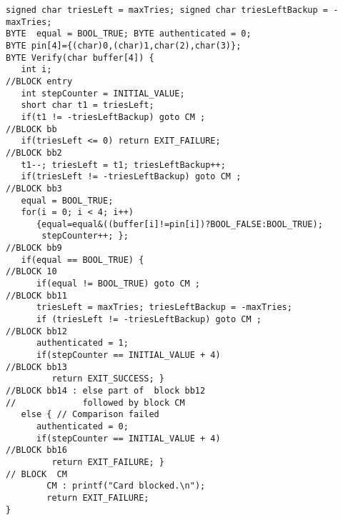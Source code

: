 \begin{scriptsize}
\begin{lstlisting}[]
signed char triesLeft = maxTries; signed char triesLeftBackup = -maxTries;
BYTE  equal = BOOL_TRUE; BYTE authenticated = 0;
BYTE pin[4]={(char)0,(char)1,char(2),char(3)};
BYTE Verify(char buffer[4]) {
   int i;
//BLOCK entry
   int stepCounter = INITIAL_VALUE;
   short char t1 = triesLeft;
   if(t1 != -triesLeftBackup) goto CM ;
//BLOCK bb
   if(triesLeft <= 0) return EXIT_FAILURE;
//BLOCK bb2
   t1--; triesLeft = t1; triesLeftBackup++;
   if(triesLeft != -triesLeftBackup) goto CM ;
//BLOCK bb3
   equal = BOOL_TRUE;
   for(i = 0; i < 4; i++)
      {equal=equal&((buffer[i]!=pin[i])?BOOL_FALSE:BOOL_TRUE);
       stepCounter++; };
//BLOCK bb9
   if(equal == BOOL_TRUE) {
//BLOCK 10
      if(equal != BOOL_TRUE) goto CM ;
//BLOCK bb11
      triesLeft = maxTries; triesLeftBackup = -maxTries;
      if (triesLeft != -triesLeftBackup) goto CM ;
//BLOCK bb12
      authenticated = 1;
      if(stepCounter == INITIAL_VALUE + 4) 
//BLOCK bb13 
         return EXIT_SUCCESS; }
//BLOCK bb14 : else part of  block bb12 
//             followed by block CM
   else { // Comparison failed
      authenticated = 0;
      if(stepCounter == INITIAL_VALUE + 4) 
//BLOCK bb16
         return EXIT_FAILURE; }
// BLOCK  CM
        CM : printf("Card blocked.\n");
        return EXIT_FAILURE;
}
\end{lstlisting}
\end{scriptsize}
